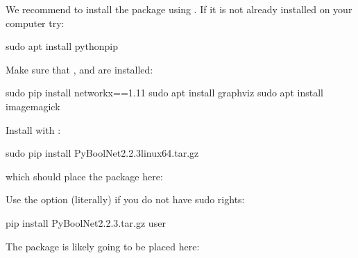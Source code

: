 \documentclass[letterpaper,10pt,english]{sphinxmanual}
\begin{document}
We recommend to install the package using . If it is not already installed on your computer try:

\begin{sphinxVerbatim}[commandchars=\\\{\}]
\PYGZdl{} sudo apt install python\PYGZhy{}pip
\end{sphinxVerbatim}

Make sure that {\hyperref[\detokenize{Installation:installation-networkx}]{}}, {\hyperref[\detokenize{Installation:installation-graphviz}]{}} and {\hyperref[\detokenize{Installation:installation-imagemagick}]{}} are installed:

\begin{sphinxVerbatim}[commandchars=\\\{\}]
\PYGZdl{} sudo pip install networkx==1.11
\PYGZdl{} sudo apt install graphviz
\PYGZdl{} sudo apt install imagemagick
\end{sphinxVerbatim}

Install  with :

\begin{sphinxVerbatim}[commandchars=\\\{\}]
\PYGZdl{} sudo pip install PyBoolNet\PYGZhy{}2.2.3\PYGZus{}linux64.tar.gz
\end{sphinxVerbatim}

which should place the package here:

\begin{sphinxVerbatim}[commandchars=\\\{\}]
\end{sphinxVerbatim}

Use the option  (literally) if you do not have sudo rights:

\begin{sphinxVerbatim}[commandchars=\\\{\}]
\PYGZdl{} pip install PyBoolNet\PYGZhy{}2.2.3.tar.gz \PYGZhy{}\PYGZhy{}user
\end{sphinxVerbatim}

The package is likely going to be placed here:
\end{document}
